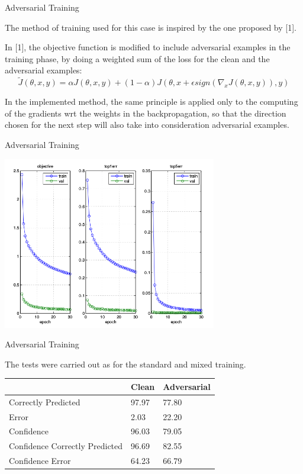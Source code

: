 \begin{tframe}{Adversarial Training}

The method of training used for this case is inspired by the one proposed by [1].

\vspace{0.1in}

In [1], the objective function is modified to include adversarial examples in the training phase, by doing a weighted sum of the loss for the clean and the adversarial examples:
$$ 	\tilde{J}(\theta, x, y) = \alpha J(\theta, x, y) + ( 1 - \alpha)J(\theta, x + \epsilon sign(\nabla_{x}J(\theta, x, y)), y) $$

In the implemented method, the same principle is applied only to the computing of the gradients wrt the weights in the backpropagation, so that the direction chosen for the next step will also take into consideration adversarial examples.

\end{tframe}

\begin{tframe}{Adversarial Training}

\begin{center}
  \includegraphics[width=0.7\textwidth]{img/train-adv.png}
	\label{train-mix} 
\end{center}

\end{tframe}

\begin{tframe}{Adversarial Training}

The tests were carried out as for the standard and mixed training.

\begin{table}[h]
\centering
\begin{tabular}{@{}lll@{}}
\toprule
                               & Clean & Adversarial \\ \midrule
Correctly Predicted            & 97.97 & 77.80       \\
Error                          & 2.03  & 22.20       \\
Confidence                     & 96.03 & 79.05       \\
Confidence Correctly Predicted & 96.69 & 82.55       \\
Confidence Error               & 64.23 & 66.79       \\ \bottomrule
\end{tabular}
\end{table}

\end{tframe}
